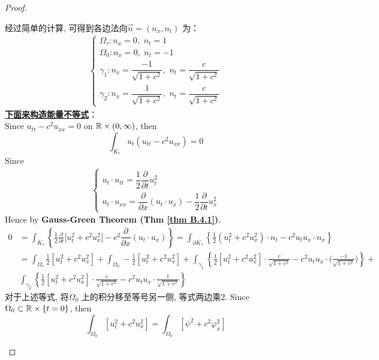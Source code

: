 \begin{thm}
\begin{proof}
\begin{itemize}
				经过简单的计算, 可得到各边法向$\vec{n} = (n_x , n_t)$ 为：
				\begin{align*}
					\begin{cases}
						\Omega_\tau : n_x = 0 , \,\, n_t = 1 \\
						\Omega_0 : n_x = 0 , \,\, n_t = -1 \\
						\gamma_1 : n_x = \dfrac{-1}{\sqrt{1 + c^2}} , \,\, n_t = \dfrac{c}{\sqrt{1 + c^2}} \\
						\gamma_2 : n_x = \dfrac{1}{\sqrt{1 + c^2}} , \,\, n_t = \dfrac{c}{\sqrt{1 + c^2}}
					\end{cases}
				\end{align*}
				\underline{\textbf{下面来构造能量不等式}}：\\
				Since $u_{tt} - c^2 u_{xx} = 0$ on $\mathbb{R} \times (0 , \infty)$, then
				\[ \int_{K_\tau} u_t (u_{tt} - c^2 u_{xx}) = 0 \]
				Since
				\begin{align*}
					\begin{cases}
						u_t \cdot u_{tt} = \dfrac{1}{2} \dfrac{\partial}{\partial t}u_{t}^2 \\
						u_t \cdot u_{xx} = \dfrac{\partial}{\partial x} (u_t \cdot u_x) - \dfrac{1}{2} \dfrac{\partial}{\partial t} u_{x}^2
					\end{cases}
				\end{align*}
				Hence by \textbf{Gauss-Green Theorem (Thm \ref{thm B.4.1})}, 
				\begin{align*}
					0 
					&= \int_{K_\tau} \left\{ \frac{1}{2} \frac{\partial}{\partial t} \big[ u_{t}^2 + c^2 u_{x}^2 \Big] - c^2 \dfrac{\partial}{\partial x} (u_t \cdot u_x) \right\} 
					= \int_{\partial K_\tau} \left\{ \frac{1}{2} ( u_{t}^2 + c^2 u_{x}^2 ) \cdot n_t - c^2 u_t u_x \cdot n_x \right\} \\
					&= \int_{\Omega_\tau} \frac{1}{2} [ u_{t}^2 + c^2 u_{x}^2 ] + 
					\int_{\Omega_0} -\frac{1}{2} [ u_{t}^2 + c^2 u_{x}^2 ] + 
					\int_{\gamma_1} \left\{ \frac{1}{2} [ u_{t}^2 + c^2 u_{x}^2 ] \cdot \frac{c}{\sqrt{1 + c^2}} - c^2 u_t u_x \cdot \Big( \frac{-1}{\sqrt{1 + c^2}} \Big) \right\} + \\
					&\int_{\gamma_2} \left\{ \frac{1}{2} [ u_{t}^2 + c^2 u_{x}^2 ] \cdot \frac{c}{\sqrt{1 + c^2}} - c^2 u_t u_x \cdot \frac{1}{\sqrt{1 + c^2}} \right\}
				\end{align*}
				对于上述等式, 将$\Omega_0$ 上的积分移至等号另一侧, 等式两边乘2. 
				\newpage
				Since $\Omega_0 \subset \mathbb{R} \times \{ t = 0 \}$, then
				\[ \int_{\Omega_0} [ u_{t}^2 + c^2 u_{x}^2 ] = \int_{\Omega_0} [ \psi^2 + c^2 \varphi_{x}^2 ] \]

\end{itemize}
\end{proof}
\end{thm}
